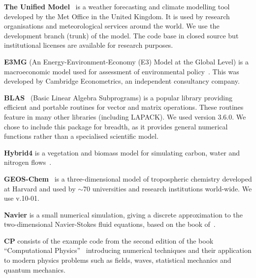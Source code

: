 \documentclass[9pt,preprint]{sigplanconf}
\theoremstyle{definition}
\begin{document}
\textbf{The Unified
  Model}~\cite{um}
is a weather forecasting and climate modelling tool developed by the
Met Office in the United Kingdom. It is used by research organisations
and meteorological services around the world. We use the development
branch (trunk) of the model. The code base in closed source but
institutional licenses are available for research purposes. %

\textbf{E3MG} (An Energy-Environment-Economy (E3) Model at the Global Level) is a macroeconomic model used for assessment of environmental policy~\cite{RePEc:aen:journl:2006se-a12}. This was developed by Cambridge Econometrics, an independent consultancy company.

\textbf{BLAS}~\cite{blas} (Basic Linear Algebra Subprograms) is a popular
library providing efficient and portable routines for vector and
matrix operations. These routines feature in many other libraries
(including LAPACK). We used version 3.6.0. We chose to include this
package for breadth, as it provides general numerical functions rather
than a specialised scientific model. 

\textbf{Hybrid4} is a vegetation and biomass model for simulating carbon, water and nitrogen flows~\cite{GBC:GBC635}.

\textbf{GEOS-Chem}~\cite{geos-chem} is a three-dimensional model of
tropospheric chemistry developed at Harvard and used by $\sim$70
universities and research institutions world-wide. We use v.10-01.

\textbf{Navier} is a small numerical simulation, giving a discrete
approximation to the two-dimensional Navier-Stokes fluid equations,
based on the book of~\citet{griebel1997numerical}.

\textbf{CP} consists of the example code from the second edition of the book ``Computational Physics''~\cite{nicholas2006computational} introducing numerical techniques and their application to modern physics problems such as fields, waves, statistical mechanics and quantum mechanics.

\end{document}
